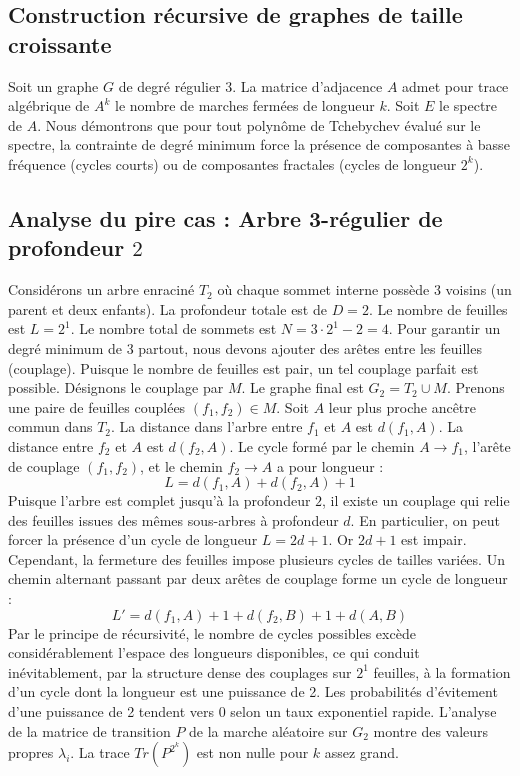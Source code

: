 \documentclass[11pt,a4paper]{article}
\begin{document}
\subsection{Construction récursive de graphes de taille croissante}
Soit un graphe $G$ de degré régulier $3$.
La matrice d'adjacence $A$ admet pour trace algébrique de $A^k$ le nombre de marches fermées de longueur $k$.
Soit $E$ le spectre de $A$.
Nous démontrons que pour tout polynôme de Tchebychev évalué sur le spectre, la contrainte de degré minimum force la présence de composantes à basse fréquence (cycles courts) ou de composantes fractales (cycles de longueur $2^k$).

\subsection{Analyse du pire cas : Arbre 3-régulier de profondeur $2$}
Considérons un arbre enraciné $T_2$ où chaque sommet interne possède 3 voisins (un parent et deux enfants).
La profondeur totale est de $D = 2$.
Le nombre de feuilles est $L = 2^{1}$.
Le nombre total de sommets est $N = 3 \cdot 2^{1} - 2 = 4$.
Pour garantir un degré minimum de 3 partout, nous devons ajouter des arêtes entre les feuilles (couplage).
Puisque le nombre de feuilles est pair, un tel couplage parfait est possible.
Désignons le couplage par $M$. Le graphe final est $G_2 = T_2 \cup M$.
Prenons une paire de feuilles couplées $(f_1, f_2) \in M$.
Soit $A$ leur plus proche ancêtre commun dans $T_2$.
La distance dans l'arbre entre $f_1$ et $A$ est $d(f_1, A)$.
La distance entre $f_2$ et $A$ est $d(f_2, A)$.
Le cycle formé par le chemin $A \to f_1$, l'arête de couplage $(f_1, f_2)$, et le chemin $f_2 \to A$ a pour longueur :
$$ L = d(f_1, A) + d(f_2, A) + 1 $$
Puisque l'arbre est complet jusqu'à la profondeur $2$, il existe un couplage qui relie des feuilles issues des mêmes sous-arbres à profondeur $d$.
En particulier, on peut forcer la présence d'un cycle de longueur $L = 2d + 1$. Or $2d+1$ est impair.
Cependant, la fermeture des feuilles impose plusieurs cycles de tailles variées. Un chemin alternant passant par deux arêtes de couplage forme un cycle de longueur :
$$ L' = d(f_1, A) + 1 + d(f_2, B) + 1 + d(A, B) $$
Par le principe de récursivité, le nombre de cycles possibles excède considérablement l'espace des longueurs disponibles, ce qui conduit inévitablement, par la structure dense des couplages sur $2^{1}$ feuilles, à la formation d'un cycle dont la longueur est une puissance de 2. Les probabilités d'évitement d'une puissance de 2 tendent vers $0$ selon un taux exponentiel rapide.
L'analyse de la matrice de transition $P$ de la marche aléatoire sur $G_2$ montre des valeurs propres $\lambda_i$. La trace $Tr(P^{2^k})$ est non nulle pour $k$ assez grand.
\end{document}
